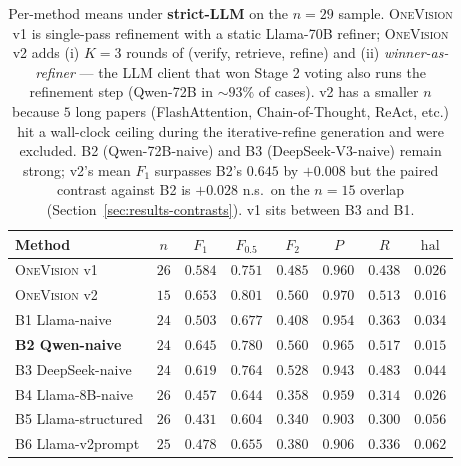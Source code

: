 \documentclass[11pt,a4paper]{article}
\begin{document}
\begin{table}[t]
\centering
\small
\begin{tabular}{l|c|cccccc}
\toprule
\textbf{Method} & $n$ & $F_1$ & $F_{0.5}$ & $F_2$ & $P$ & $R$ & $\text{hal}$ \\
\midrule
\textsc{OneVision} v1   & $26$ & $0.584$ & $0.751$ & $0.485$ & $0.960$ & $0.438$ & $0.026$ \\
\textsc{OneVision} v2   & $15$ & $\mathbf{0.653}$ & $\mathbf{0.801}$ & $0.560$ & $\mathbf{0.970}$ & $0.513$ & $\mathbf{0.016}$ \\
B1 Llama-naive          & $24$ & $0.503$ & $0.677$ & $0.408$ & $0.954$ & $0.363$ & $0.034$ \\
\textbf{B2 Qwen-naive}  & $24$ & $0.645$ & $0.780$ & $\mathbf{0.560}$ & $0.965$ & $\mathbf{0.517}$ & $0.015$ \\
B3 DeepSeek-naive       & $24$ & $0.619$ & $0.764$ & $0.528$ & $0.943$ & $0.483$ & $0.044$ \\
B4 Llama-8B-naive       & $26$ & $0.457$ & $0.644$ & $0.358$ & $0.959$ & $0.314$ & $0.026$ \\
B5 Llama-structured     & $26$ & $0.431$ & $0.604$ & $0.340$ & $0.903$ & $0.300$ & $0.056$ \\
B6 Llama-v2prompt       & $25$ & $0.478$ & $0.655$ & $0.380$ & $0.906$ & $0.336$ & $0.062$ \\
\bottomrule
\end{tabular}
\caption{Per-method means under \textbf{strict-LLM} on the
$n\!=\!29$ sample. \textsc{OneVision} v1 is single-pass refinement
with a static Llama-70B refiner; \textsc{OneVision} v2 adds (i)
$K\!=\!3$ rounds of (verify, retrieve, refine) and (ii)
\emph{winner-as-refiner} — the LLM client that won Stage 2 voting
also runs the refinement step (Qwen-72B in $\sim\!93\%$ of cases).
v2 has a smaller $n$ because $5$ long papers
(FlashAttention, Chain-of-Thought, ReAct, etc.) hit a wall-clock
ceiling during the iterative-refine generation and were excluded.
B2 (Qwen-72B-naive) and B3 (DeepSeek-V3-naive) remain strong;
v2's mean $F_1$ surpasses B2's $0.645$ by $+0.008$ but the paired
contrast against B2 is $+0.028$ n.s.\ on the $n\!=\!15$ overlap
(Section~\ref{sec:results-contrasts}). v1 sits between B3 and B1.}
\label{tab:per-method-strict}
\end{table}
\end{document}
